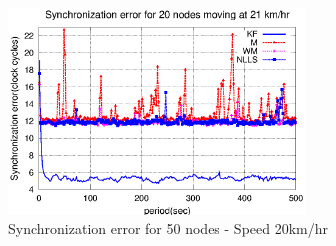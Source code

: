 \documentclass[a4paper,10pt]{report}
\begin{document}
\begin{figure}
\centering
\includegraphics[width=0.7\textwidth]{16output-s20}
\caption{Synchronization error for 50 nodes - Speed 20km/hr} 
\label{16output20}
\end{figure}
\end{document}
